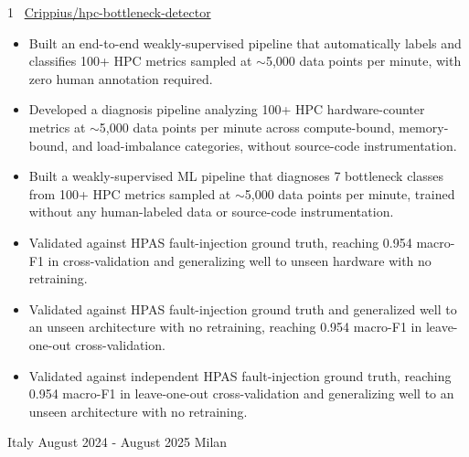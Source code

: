 \documentclass[10pt,a4paper,ragged2e,withhyper]{cv}
\begin{document}
\begin{paracol}{1}
{\small \faGithub~\href{https://github.com/Crippius/hpc-bottleneck-detector}{Crippius/hpc-bottleneck-detector}}

\smallskip
\begin{itemize}

    \ifde
        \item Built an end-to-end weakly-supervised pipeline that automatically labels and classifies 100+ HPC metrics sampled at $\sim$5,000 data points per minute, with zero human annotation required.
    \else
        \ifhpc
            \item Developed a diagnosis pipeline analyzing 100+ HPC hardware-counter metrics at $\sim$5,000 data points per minute across compute-bound, memory-bound, and load-imbalance categories, without source-code instrumentation.
        \else
            \item Built a weakly-supervised ML pipeline that diagnoses 7 bottleneck classes from 100+ HPC metrics sampled at $\sim$5,000 data points per minute, trained without any human-labeled data or source-code instrumentation.
        \fi
    \fi

    \ifde
        \item Validated against HPAS fault-injection ground truth, reaching 0.954 macro-F1 in cross-validation and generalizing well to unseen hardware with no retraining.
    \else
        \ifhpc
            \item Validated against HPAS fault-injection ground truth and generalized well to an unseen architecture with no retraining, reaching 0.954 macro-F1 in leave-one-out cross-validation.
        \else
            \item Validated against independent HPAS fault-injection ground truth, reaching 0.954 macro-F1 in leave-one-out cross-validation and generalizing well to an unseen architecture with no retraining.
        \fi
    \fi

\end{itemize}

\medskip

{Italy}
{August 2024 - August 2025}
{Milan}
{\footnotesize\faCode \hspace{1pt}
}

\begin{itemize}


\end{itemize}
\end{paracol}
\end{document}
